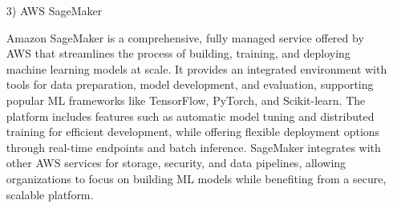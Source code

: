 \documentclass[conference]{IEEEtran}
\begin{document}
\begin{enumerate}
\begin{itemize}
        \item [3)] AWS SageMaker\par
        \vspace{0.3em}
        Amazon SageMaker is a comprehensive, fully managed service offered by AWS that streamlines the process of building, training, and deploying machine learning models at scale. It provides an integrated environment with tools for data preparation, model development, and evaluation, supporting popular ML frameworks like TensorFlow, PyTorch, and Scikit-learn. The platform includes features such as automatic model tuning and distributed training for efficient development, while offering flexible deployment options through real-time endpoints and batch inference. SageMaker integrates with other AWS services for storage, security, and data pipelines, allowing organizations to focus on building ML models while benefiting from a secure, scalable platform.
    \end{itemize}
\end{enumerate}

\vspace{1em}
\end{document}
